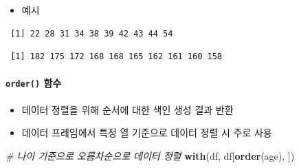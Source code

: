 \documentclass[
  11pt,
]{krantz}
\newenvironment{Shaded}{\begin{snugshade}}{\end{snugshade}}
\newcommand{\CommentTok}[1]{\textcolor[rgb]{0.37,0.37,0.37}{\textit{#1}}}
\newcommand{\DataTypeTok}[1]{\textcolor[rgb]{0.27,0.27,0.27}{#1}}
\newcommand{\KeywordTok}[1]{\textcolor[rgb]{0.27,0.27,0.27}{\textbf{#1}}}
\newcommand{\NormalTok}[1]{#1}
\newcommand{\OperatorTok}[1]{\textcolor[rgb]{0.43,0.43,0.43}{\textbf{#1}}}
\newcommand{\OtherTok}[1]{\textcolor[rgb]{0.37,0.37,0.37}{#1}}
\providecommand{\tightlist}{%
  \setlength{\itemsep}{0pt}\setlength{\parskip}{0pt}}
\begin{document}
\normalsize

\begin{itemize}
\tightlist
\item
  예시
\end{itemize}

\footnotesize

\begin{Shaded}
\end{Shaded}

\begin{verbatim}
 [1] 22 28 31 34 38 39 42 43 44 54
\end{verbatim}

\begin{Shaded}
\end{Shaded}

\begin{verbatim}
 [1] 182 175 172 168 168 165 162 161 160 158
\end{verbatim}

\normalsize

\hypertarget{order}{%
\paragraph{\texorpdfstring{\texttt{order()} 함수}{order() 함수}}\label{order}}

\begin{itemize}
\tightlist
\item
  데이터 정렬을 위해 순서에 대한 색인 생성 결과 반환
\item
  데이터 프레임에서 특정 열 기준으로 데이터 정렬 시 주로 사용
\end{itemize}

\footnotesize

\begin{Shaded}
\begin{Highlighting}[]
\CommentTok{# 나이 기준으로 오름차순으로 데이터 정렬}
\KeywordTok{with}\NormalTok{(df, df[}\KeywordTok{order}\NormalTok{(age), ])}
\end{Highlighting}
\end{Shaded}
\end{document}
